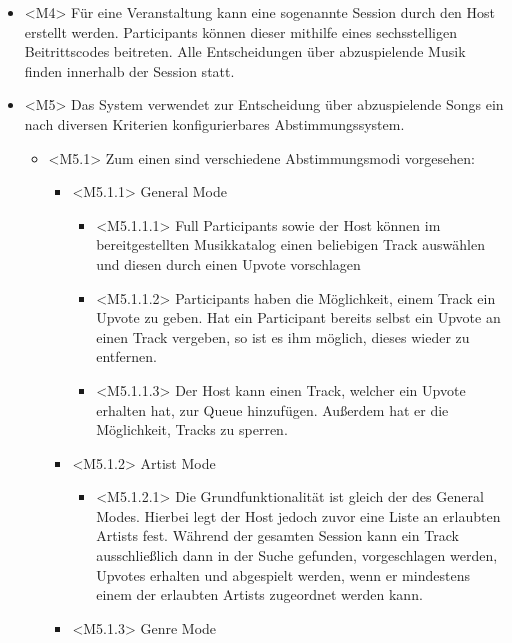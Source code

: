 \documentclass[oneside, ngerman]{sdqtechreport}
\begin{document}
\begin{itemize}
\begin{itemize}
    \end{itemize}
    \item \hypertarget{<M4>}{}<M4> Für eine Veranstaltung kann eine sogenannte Session durch den Host erstellt werden. Participants können dieser mithilfe eines sechsstelligen Beitrittscodes beitreten. Alle Entscheidungen über abzuspielende Musik finden innerhalb der Session statt.
    \item \hypertarget{<M5>}{}<M5> Das System verwendet zur Entscheidung über abzuspielende Songs ein nach diversen Kriterien konfigurierbares Abstimmungssystem.
    \begin{itemize}
        \item \hypertarget{<M5.1>}{}<M5.1> Zum einen sind verschiedene Abstimmungsmodi vorgesehen:
        \begin{itemize}
            \item \hypertarget{<M5.1.1>}{}<M5.1.1> General Mode
            \begin{itemize}
                \item \hypertarget{<M5.1.1.1>}{}<M5.1.1.1> Full Participants sowie der Host können im bereitgestellten Musikkatalog einen beliebigen Track auswählen und diesen durch einen Upvote vorschlagen
                \item \hypertarget{<M5.1.1.2>}{}<M5.1.1.2> Participants haben die Möglichkeit, einem Track ein Upvote zu geben. Hat ein Participant bereits selbst ein Upvote an einen Track vergeben, so ist es ihm möglich, dieses wieder zu entfernen.
                \item \hypertarget{<M5.1.1.3>}{}<M5.1.1.3> Der Host kann einen Track, welcher ein Upvote erhalten hat, zur Queue hinzufügen. Außerdem hat er die Möglichkeit, Tracks zu sperren.
            \end{itemize}
            \item \hypertarget{<M5.1.2>}{}<M5.1.2> Artist Mode
            \begin{itemize}
                \item \hypertarget{<M5.1.2.1>}{}<M5.1.2.1> Die Grundfunktionalität ist gleich der des General Modes. Hierbei legt der Host jedoch zuvor eine Liste an erlaubten Artists fest. Während der gesamten Session kann ein Track ausschließlich dann in der Suche gefunden, vorgeschlagen werden, Upvotes erhalten und abgespielt werden, wenn er mindestens einem der erlaubten Artists zugeordnet werden kann.
            \end{itemize}
            \item \hypertarget{<M5.1.3>}{}<M5.1.3> Genre Mode

\end{itemize}
\end{itemize}
\end{itemize}
\end{document}
